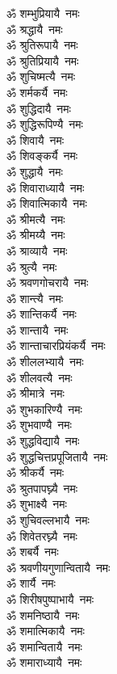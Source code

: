 \begin{flushleft}
\begin{multicols}{2}
ॐ शम्भुप्रियायै~नमः\\
ॐ श्रद्धायै~नमः\\
ॐ श्रुतिरूपायै~नमः\\
ॐ श्रुतिप्रियायै~नमः\\
ॐ शुचिष्मत्यै~नमः\hfill{}\\
ॐ शर्मकर्यै~नमः\\
ॐ शुद्धिदायै~नमः\\
ॐ शुद्धिरूपिण्यै~नमः\\
ॐ शिवायै~नमः\\
ॐ शिवङ्कर्यै~नमः\\
ॐ शुद्धायै~नमः\\
ॐ शिवाराध्यायै~नमः\\
ॐ शिवात्मिकायै~नमः\\
ॐ श्रीमत्यै~नमः\\
ॐ श्रीमय्यै~नमः\hfill{}\\
ॐ श्राव्यायै~नमः\\
ॐ श्रुत्यै~नमः\\
ॐ श्रवणगोचरायै~नमः\\
ॐ शान्त्यै~नमः\\
ॐ शान्तिकर्यै~नमः\\
ॐ शान्तायै~नमः\\
ॐ शान्ताचारप्रियंकर्यै~नमः\\
ॐ शीललभ्यायै~नमः\\
ॐ शीलवत्यै~नमः\\
ॐ श्रीमात्रे~नमः\hfill{}\\
ॐ शुभकारिण्यै~नमः\\
ॐ शुभवाण्यै~नमः\\
ॐ शुद्धविद्यायै~नमः\\
ॐ शुद्धचित्तप्रपूजितायै~नमः\\
ॐ श्रीकर्यै~नमः\\
ॐ श्रुतपापघ्न्यै~नमः\\
ॐ शुभाक्ष्यै~नमः\\
ॐ शुचिवल्लभायै~नमः\\
ॐ शिवेतरघ्न्यै~नमः\\
ॐ शबर्यै~नमः\hfill{}\\
ॐ श्रवणीयगुणान्वितायै~नमः\\
ॐ शार्यै~नमः\\
ॐ शिरीषपुष्पाभायै~नमः\\
ॐ शमनिष्ठायै~नमः\\
ॐ शमात्मिकायै~नमः\\
ॐ शमान्वितायै~नमः\\
ॐ शमाराध्यायै~नमः\\

\end{multicols}
\end{flushleft}
